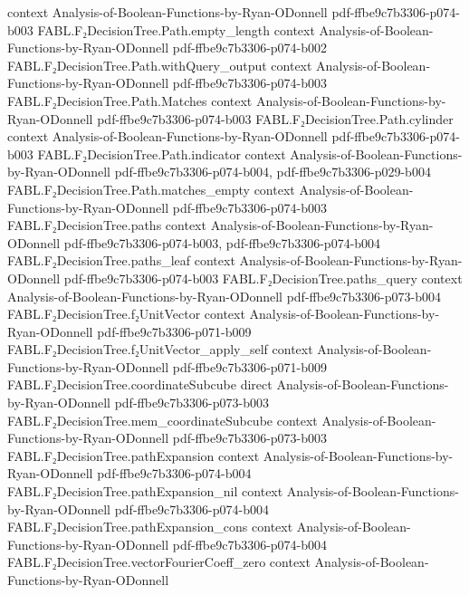 \begin{theorem}
  {context}
  {Analysis-of-Boolean-Functions-by-Ryan-ODonnell}
  {pdf-ffbe9c7b3306-p074-b003}
\proofstep
  {FABL.F₂DecisionTree.Path.empty_length}
  {context}
  {Analysis-of-Boolean-Functions-by-Ryan-ODonnell}
  {pdf-ffbe9c7b3306-p074-b002}
\proofstep
  {FABL.F₂DecisionTree.Path.withQuery_output}
  {context}
  {Analysis-of-Boolean-Functions-by-Ryan-ODonnell}
  {pdf-ffbe9c7b3306-p074-b003}
\proofstep
  {FABL.F₂DecisionTree.Path.Matches}
  {context}
  {Analysis-of-Boolean-Functions-by-Ryan-ODonnell}
  {pdf-ffbe9c7b3306-p074-b003}
\proofstep
  {FABL.F₂DecisionTree.Path.cylinder}
  {context}
  {Analysis-of-Boolean-Functions-by-Ryan-ODonnell}
  {pdf-ffbe9c7b3306-p074-b003}
\proofstep
  {FABL.F₂DecisionTree.Path.indicator}
  {context}
  {Analysis-of-Boolean-Functions-by-Ryan-ODonnell}
  {pdf-ffbe9c7b3306-p074-b004,
    pdf-ffbe9c7b3306-p029-b004}
\proofstep
  {FABL.F₂DecisionTree.Path.matches_empty}
  {context}
  {Analysis-of-Boolean-Functions-by-Ryan-ODonnell}
  {pdf-ffbe9c7b3306-p074-b003}
\proofstep
  {FABL.F₂DecisionTree.paths}
  {context}
  {Analysis-of-Boolean-Functions-by-Ryan-ODonnell}
  {pdf-ffbe9c7b3306-p074-b003,
    pdf-ffbe9c7b3306-p074-b004}
\proofstep
  {FABL.F₂DecisionTree.paths_leaf}
  {context}
  {Analysis-of-Boolean-Functions-by-Ryan-ODonnell}
  {pdf-ffbe9c7b3306-p074-b003}
\proofstep
  {FABL.F₂DecisionTree.paths_query}
  {context}
  {Analysis-of-Boolean-Functions-by-Ryan-ODonnell}
  {pdf-ffbe9c7b3306-p073-b004}
\proofstep
  {FABL.F₂DecisionTree.f₂UnitVector}
  {context}
  {Analysis-of-Boolean-Functions-by-Ryan-ODonnell}
  {pdf-ffbe9c7b3306-p071-b009}
\proofstep
  {FABL.F₂DecisionTree.f₂UnitVector_apply_self}
  {context}
  {Analysis-of-Boolean-Functions-by-Ryan-ODonnell}
  {pdf-ffbe9c7b3306-p071-b009}
\proofstep
  {FABL.F₂DecisionTree.coordinateSubcube}
  {direct}
  {Analysis-of-Boolean-Functions-by-Ryan-ODonnell}
  {pdf-ffbe9c7b3306-p073-b003}
\proofstep
  {FABL.F₂DecisionTree.mem_coordinateSubcube}
  {context}
  {Analysis-of-Boolean-Functions-by-Ryan-ODonnell}
  {pdf-ffbe9c7b3306-p073-b003}
\proofstep
  {FABL.F₂DecisionTree.pathExpansion}
  {context}
  {Analysis-of-Boolean-Functions-by-Ryan-ODonnell}
  {pdf-ffbe9c7b3306-p074-b004}
\proofstep
  {FABL.F₂DecisionTree.pathExpansion_nil}
  {context}
  {Analysis-of-Boolean-Functions-by-Ryan-ODonnell}
  {pdf-ffbe9c7b3306-p074-b004}
\proofstep
  {FABL.F₂DecisionTree.pathExpansion_cons}
  {context}
  {Analysis-of-Boolean-Functions-by-Ryan-ODonnell}
  {pdf-ffbe9c7b3306-p074-b004}
\proofstep
  {FABL.F₂DecisionTree.vectorFourierCoeff_zero}
  {context}
  {Analysis-of-Boolean-Functions-by-Ryan-ODonnell}

\end{theorem}
